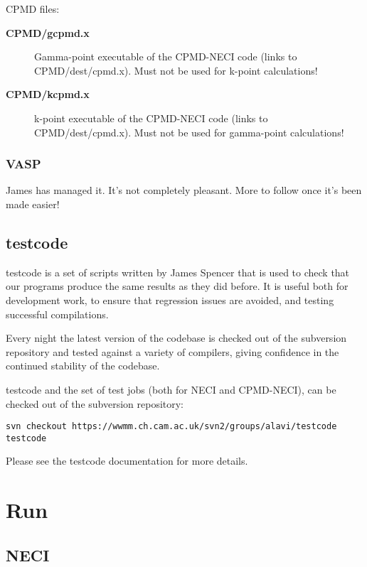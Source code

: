 \documentclass[openany,a4paper,10pt]{manual}
\begin{document}
CPMD files:
\begin{description}
\item[\textbf{CPMD/gcpmd.x}]
Gamma-point executable of the CPMD-NECI code (links to CPMD/dest/cpmd.x).
Must not be used for k-point calculations!

\item[\textbf{CPMD/kcpmd.x}]
k-point executable of the CPMD-NECI code (links to CPMD/dest/cpmd.x).
Must not be used for gamma-point calculations!

\end{description}


\subsection{VASP}

James has managed it.  It's not completely pleasant.  More to follow
once it's been made easier!


\section{testcode}

testcode is a set of scripts written by James Spencer that is used to
check that our programs produce the same results as they did before.
It is useful both for development work, to ensure that regression issues
are avoided, and testing successful compilations.

Every night the latest version of the codebase is checked out of the
subversion repository and tested against a variety of compilers, giving
confidence in the continued stability of the codebase.

testcode and the set of test jobs (both for NECI and CPMD-NECI), can be
checked out of the subversion repository:

\begin{Verbatim}[commandchars=@\[\]]
svn checkout https://wwmm.ch.cam.ac.uk/svn2/groups/alavi/testcode testcode
\end{Verbatim}

Please see the testcode documentation for more details.

\resetcurrentobjects


\hypertarget{run}{}\chapter{Run}


\section{NECI}
\end{document}
